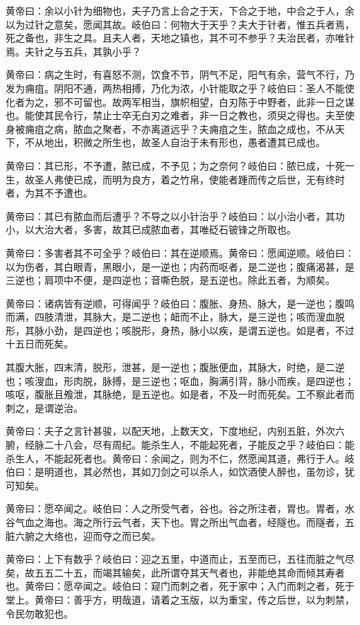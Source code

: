 \documentclass[12pt,UTF8]{ctexbook}
\begin{document}
	黄帝曰：余以小针为细物也，夫子乃言上合之于天，下合之于地，中合之于人，余以为过针之意矣，愿闻其故。岐伯曰：何物大于天乎？夫大于针者，惟五兵者焉，死之备也，非生之具。且夫人者，天地之镇也，其不可不参乎？夫治民者，亦唯针焉。夫针之与五兵，其孰小乎？
	
	黄帝曰：病之生时，有喜怒不测，饮食不节，阴气不足，阳气有余，营气不行，乃发为痈疽。阴阳不通，两热相搏，乃化为浓，小针能取之乎？岐伯曰：圣人不能使化者为之，邪不可留也。故两军相当，旗帜相望，白刃陈于中野者，此非一日之谋也。能使其民令行，禁止士卒无白刃之难者，非一日之教也，须臾之得也。夫至使身被痈疽之病，脓血之聚者，不亦离道远乎？夫痈疽之生，脓血之成也，不从天下，不从地出，积微之所生也，故圣人自治于未有形也，愚者遭其已成也。
	
	黄帝曰：其已形，不予遭，脓已成，不予见；为之奈何？岐伯曰：脓已成，十死一生，故圣人弗使已成，而明为良方，着之竹帛，使能者踵而传之后世，无有终时者，为其不予遭也。
	
	黄帝曰：其已有脓血而后遭乎？不导之以小针治乎？岐伯曰：以小治小者，其功小，以大治大者，多害，故其已成脓血者，其唯砭石铍锋之所取也。
	
	黄帝曰：多害者其不可全乎？岐伯曰：其在逆顺焉。黄帝曰：愿闻逆顺。岐伯曰：以为伤者，其白眼青，黑眼小，是一逆也；内药而呕者，是二逆也；腹痛渴甚，是三逆也；肩项中不便，是四逆也；音嘶色脱，是五逆也。除此五者，为顺矣。
	
	黄帝曰：诸病皆有逆顺，可得闻乎？岐伯曰：腹胀、身热、脉大，是一逆也；腹鸣而满，四肢清泄，其脉大，是二逆也；衄而不止，脉大，是三逆也；咳而溲血脱形，其脉小劲，是四逆也；咳脱形，身热，脉小以疾，是谓五逆也。如是者，不过十五日而死矣。
	
	其腹大胀，四末清，脱形，泄甚，是一逆也；腹胀便血，其脉大，时绝，是二逆也；咳溲血，形肉脱，脉搏，是三逆也；呕血，胸满引背，脉小而疾，是四逆也；咳呕，腹胀且飧泄，其脉绝，是五逆也。如是者，不及一时而死矣。工不察此者而刺之，是谓逆治。
	
	黄帝曰：夫子之言针甚骏，以配天地，上数天文，下度地纪，内别五脏，外次六腑，经脉二十八会，尽有周纪。能杀生人，不能起死者，子能反之乎？岐伯曰：能杀生人，不能起死者也。黄帝曰：余闻之，则为不仁，然愿闻其道，弗行于人。岐伯曰：是明道也，其必然也，其如刀剑之可以杀人，如饮酒使人醉也，虽勿诊，犹可知矣。
	
	黄帝曰：愿卒闻之。岐伯曰：人之所受气者，谷也。谷之所注者，胃也。胃者，水谷气血之海也。海之所行云气者，天下也。胃之所出气血者，经隧也。而隧者，五脏六腑之大络也，迎而夺之而已矣。
	
	黄帝曰：上下有数乎？岐伯曰：迎之五里，中道而止，五至而已，五往而脏之气尽矣，故五五二十五，而竭其输矣，此所谓夺其天气者也，非能绝其命而倾其寿者也。黄帝曰：愿卒闻之。岐伯曰：窥门而刺之者，死于家中；入门而刺之者，死于堂上。黄帝曰：善乎方，明哉道，请着之玉版，以为重宝，传之后世，以为刺禁，令民勿敢犯也。
\end{document}
